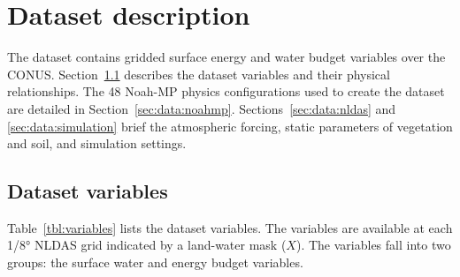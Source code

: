 \documentclass[essd]{copernicus}
\begin{document}
\section{Dataset description} \label{sec:data}

The dataset contains gridded surface energy and water budget variables over the
CONUS. Section~\ref{sec:data:variables} describes the dataset variables and
their physical relationships. The 48 Noah-MP physics configurations used to
create the dataset are detailed in Section~\ref{sec:data:noahmp}.
Sections~\ref{sec:data:nldas} and \ref{sec:data:simulation} brief the
atmospheric forcing, static parameters of vegetation and soil, and simulation
settings.


\subsection{Dataset variables} \label{sec:data:variables}

Table~\ref{tbl:variables} lists the dataset variables. The variables are
available at each 1/8° NLDAS grid indicated by a land-water mask
($X$). The variables fall into two groups: the surface water and energy budget
variables.
\end{document}
